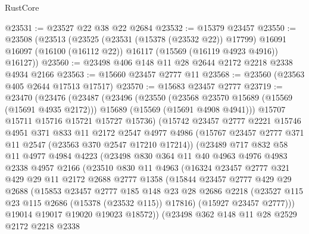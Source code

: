\begin{lexlean}{RustCore}
\begin{coremodule}
@23531 := @23527 @22 @38 @22 @2684
@23532 := @15379 @23457
@23550 := @23508
    (@23513
      (@23525
        (@23531 (@15378 (@23532 @22)) @17799)
        @16091
        @16097
        (@16100 (@16112 @22))
        @16117
        (@15569 (@16119 @4923 @4916))
        @16127))
@23560 := @23498 @406 @148 @11 @28 @2644 @2172 @2218 @2338 @4934 @2166
@23563 := @15660 @23457 @2777 @11
@23568 := @23560 (@23563 @405 @2644 @17513 @17517)
@23570 := @15683 @23457 @2777
@23719 := @23470
    (@23476
      (@23487
        (@23496
          (@23550
            (@23568 @23570 @15689 (@15569 (@15691 @4935 @2172)))
            @15689
            (@15569 (@15691 @4908 @4941)))
          @15707
          @15711
          @15716
          @15721
          @15727
          @15736)
        (@15742
          @23457
          @2777
          @2221
          @15746
          @4951
          @371
          @833
          @11
          @2172
          @2547
          @4977
          @4986
          (@15767 @23457 @2777 @371 @11 @2547 (@23563 @370 @2547 @17210 @17214))
          (@23489
            @717
            @832
            @58
            @11
            @4977
            @4984
            @4223
            (@23498
              @830
              @364
              @11
              @40
              @4963
              @4976
              @4983
              @2338
              @4957
              @2166
              (@23510
                @830
                @11
                @4963
                (@16324
                  @23457
                  @2777
                  @321
                  @429
                  @29
                  @11
                  @2172
                  @2688
                  @2777
                  @1358
                  (@15844
                    @23457
                    @2777
                    @429
                    @29
                    @2688
                    (@15853
                      @23457
                      @2777
                      @185
                      @148
                      @23
                      @28
                      @2686
                      @2218
                      (@23527 @115 @23 @115 @2686 (@15378 (@23532 @115)) @17816)
                      (@15927 @23457 @2777)))
                  @19014
                  @19017
                  @19020
                  @19023
                  @18572))
              (@23498
                @362
                @148
                @11
                @28
                @2529
                @2172
                @2218
                @2338

\end{coremodule}
\end{lexlean}
